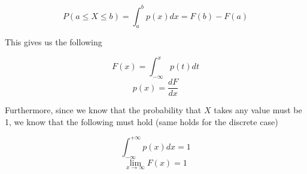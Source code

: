 \documentclass{article}
\begin{document}
\[ P(a \leq X \leq b) = \int_a^b p(x)dx = F(b) - F(a) \]

This gives us the following

\[ F(x) = \int_{-\infty}^x p(t)dt \]
\[ p(x) = \frac{dF}{dx} \]

Furthermore, since we know that the probability that $X$ takes any value must be 1, we know that the following must hold (same holds for the discrete case)

\[ \int_{-\infty}^{+\infty} p(x)dx = 1 \]
\[ \lim_{x \to \infty} F(x) = 1 \]
\end{document}
